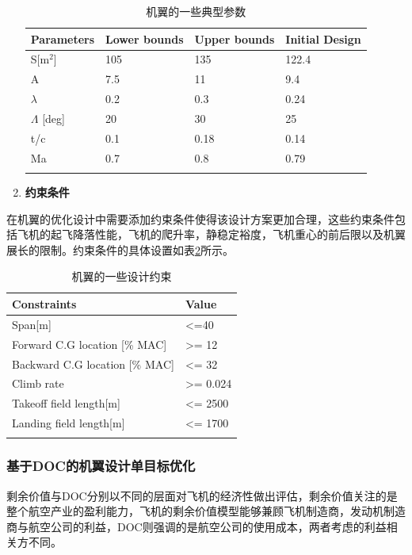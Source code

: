 \documentclass[12pt,a4paper]{report}
\begin{document}
\begin{enumerate}
\begin{table}
\centering
\caption{机翼的一些典型参数}
\begin{tabular}{|p{2.4cm}|p{2.4cm}|p{2.4cm}|p{2.4cm}|}
\hhline{|====|}
Parameters	& Lower bounds	& Upper bounds	& Initial Design \\ \hline
S[m$^2$]	& 105	& 135	& 122.4 \\ \hline
A	&7.5	& 11	& 9.4 \\ \hline
$\lambda$ 	& 0.2	& 0.3	& 0.24 \\ \hline
$\Lambda$ [deg] &	20	& 30	&25 \\ \hline
t/c	& 0.1	& 0.18	& 0.14 \\ \hline
Ma	& 0.7	& 0.8	& 0.79 \\ 
\hhline{|====|}
\end{tabular}
\label{wing-pars}
\end{table}


\item \textbf{约束条件}
\end{enumerate}

在机翼的优化设计中需要添加约束条件使得该设计方案更加合理，这些约束条件包括飞机的起飞降落性能，飞机的爬升率，静稳定裕度，飞机重心的前后限以及机翼展长的限制。约束条件的具体设置如表\ref{wing-cons}所示。

\begin{table}
\centering
\caption{机翼的一些设计约束}
\begin{tabular}{|p{7cm}|p{3cm}|}
\hhline{|==|}
Constraints		& Value \\ \hline
Span[m] &	<=40\\ \hline
Forward C.G location [\% MAC]	& >=	12 \\ \hline
Backward C.G location [\% MAC]	& <=	32 \\ \hline
Climb rate	& >=	0.024 \\ \hline
Takeoff field length[m]	& <=	2500 \\ \hline
Landing field length[m]	& <=	1700 \\ 
\hhline{|==|}
\end{tabular}
\label{wing-cons}
\end{table}

\subsubsection{基于DOC的机翼设计单目标优化}
剩余价值与DOC分别以不同的层面对飞机的经济性做出评估，剩余价值关注的是整个航空产业的盈利能力，飞机的剩余价值模型能够兼顾飞机制造商，发动机制造商与航空公司的利益，DOC则强调的是航空公司的使用成本，两者考虑的利益相关方不同。
\end{document}
